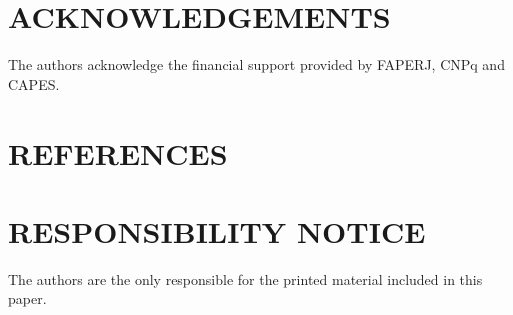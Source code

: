 \documentclass[10pt,fleqn,a4paper,twoside]{article}
\begin{document}
\section{ACKNOWLEDGEMENTS}

The authors acknowledge the financial support provided by FAPERJ, CNPq and CAPES.

\section{REFERENCES} 


\renewcommand{\refname}{}


\section{RESPONSIBILITY NOTICE}

The authors are the only responsible for the printed material included in this paper.
\end{document}
